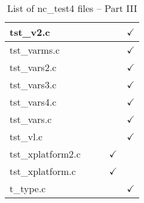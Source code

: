 \begin{table}[H]
\begin{tabular}{|l|c|c|c|c|}
tst\_v2.c   &  &   &   & $\checkmark$    \\ \hline
tst\_varms.c   &  &   &   & $\checkmark$    \\ \hline
tst\_vars2.c   &  &   &   & $\checkmark$    \\ \hline
tst\_vars3.c   &  &   &   & $\checkmark$    \\ \hline
tst\_vars4.c   &  &   &   & $\checkmark$    \\ \hline
tst\_vars.c   &  &   &   & $\checkmark$    \\ \hline
tst\_vl.c   &  &   &   & $\checkmark$    \\ \hline
tst\_xplatform2.c   &  &   &  $\checkmark$ &    \\ \hline
tst\_xplatform.c   &  &   &  $\checkmark$ &    \\ \hline
t\_type.c   &  &   &   & $\checkmark$    \\ \hline
\hline
\end{tabular}
\caption{\label{tab:nc_test4_3} List of nc\_test4 files -- Part III}
\end{table}

